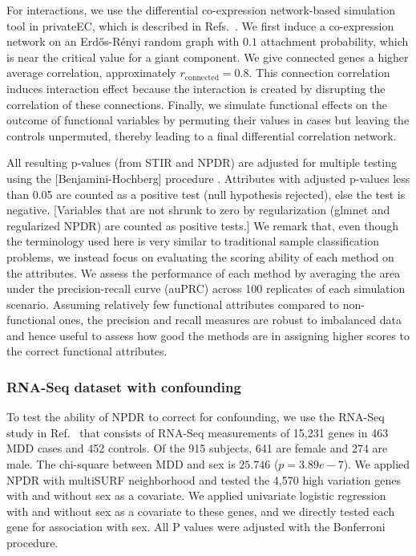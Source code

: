 \documentclass[10pt]{article}
\begin{document}
For interactions, we use the differential co-expression network-based simulation tool in privateEC, which is described in Refs.~\cite{le17, lareau15}. 
We first induce a co-expression network on an Erd\H{o}s-R\'enyi random graph with $0.1$ attachment probability, which is near the critical value for a giant component.
We give connected genes a higher average correlation, approximately $r_{\text{connected}}=0.8$. %
This connection correlation induces interaction effect because the interaction is created by disrupting the correlation of these connections. %
Finally, we simulate functional effects on the outcome of functional variables by permuting their values in cases but leaving the controls unpermuted, thereby leading to a final differential correlation network. 

All resulting p-values (from STIR and NPDR) are adjusted for multiple testing using the [Benjamini-Hochberg] procedure \cite{benjamini01}.
Attributes with adjusted p-values less than 0.05 are counted as a positive test (null hypothesis rejected), else the test is negative.
[Variables that are not shrunk to zero by regularization (glmnet and regularized NPDR) are counted as positive tests.]
We remark that, even though the terminology used here is very similar to traditional sample classification problems, we instead focus on evaluating the scoring ability of each method on the attributes.
We assess the performance of each method by averaging the area under the precision-recall curve (auPRC) across 100 replicates of each simulation scenario.
Assuming relatively few functional attributes compared to non-functional ones, the precision and recall measures are robust to imbalanced data and hence useful to assess how good the methods are in assigning higher scores to the correct functional attributes.


\subsubsection{RNA-Seq dataset with confounding}
To test the ability of NPDR to correct for confounding, we use the RNA-Seq study in Ref.~\cite{mostafavi14} that consists of RNA-Seq measurements of 15,231 genes in 463 MDD cases and 452 controls.
Of the 915 subjects, 641 are female and 274 are male.
The chi-square between MDD and sex is $25.746$ ($p=3.89e-7$).
We applied NPDR with multiSURF neighborhood and tested the 4,570 high variation genes with and without sex as a covariate. 
We applied univariate logistic regression with and without sex as a covariate to these genes, and we directly tested each gene for association with sex.
All P values were adjusted with the Bonferroni procedure.
\end{document}
